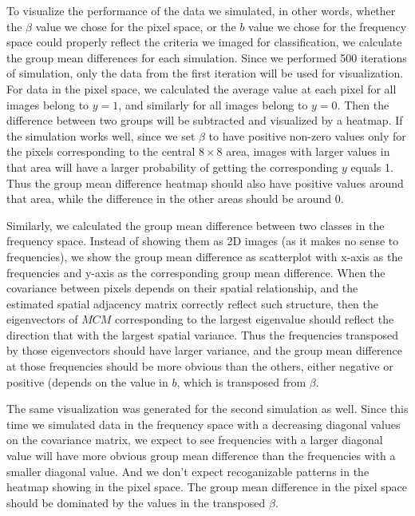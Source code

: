 \documentclass[12pt]{article}
\begin{document}
To visualize the performance of the data we simulated, in other words, whether the \( \beta \) value we chose for the pixel space, or the \( b \) value we chose for the frequency space could properly reflect the criteria we imaged for classification, we calculate the group mean differences for each simulation. Since we performed 500 iterations of simulation, only the data from the first iteration will be used for visualization. For data in the pixel space, we calculated the average value at each pixel for all images belong to \( y=1 \), and similarly for all images belong to \( y=0 \). Then the difference between two groups will be subtracted and visualized by a heatmap. If the simulation works well, since we set \( \beta \) to have positive non-zero values only for the pixels corresponding to the central \( 8 \times 8 \) area, images with larger values in that area will have a larger probability of getting the corresponding \( y \) equals 1. Thus the group mean difference heatmap should also have positive values around that area, while the difference in the other areas should be around 0.

Similarly, we calculated the group mean difference between two classes in the frequency space. Instead of showing them as 2D images (as it makes no sense to frequencies), we show the group mean difference as scatterplot with x-axis as the frequencies and y-axis as the corresponding group mean difference. When the covariance between pixels depends on their spatial relationship, and the estimated spatial adjacency matrix correctly reflect such structure, then the eigenvectors of \( M C M \) corresponding to the largest eigenvalue should reflect the direction that with the largest spatial variance. Thus the frequencies transposed by those eigenvectors should have larger variance, and the group mean difference at those frequencies should be more obvious than the others, either negative or positive (depends on the value in \( b \), which is transposed from \( \beta \). 

The same visualization was generated for the second simulation as well. Since this time we simulated data in the frequency space with a decreasing diagonal values on the covariance matrix, we expect to see frequencies with a larger diagonal value will have more obvious group mean difference than the frequencies with a smaller diagonal value. And we don't expect recoganizable patterns in the heatmap showing in the pixel space. The group mean difference in the pixel space should be dominated by the values in the transposed \( \beta \).
\end{document}

